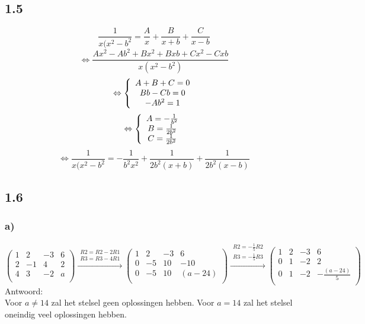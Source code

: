 \documentclass[11pt]{article}
\begin{document}
\subsection*{1.5}
\[
\frac{1}{x(x^2-b^2} = \frac{A}{x} + \frac{B}{x+b} + \frac{C}{x-b}
\]
\[
\Leftrightarrow
\frac{Ax^2-Ab^2+Bx^2+Bxb+Cx^2-Cxb}{x(x^2-b^2)}
\]
\[
\Leftrightarrow
\left\lbrace
\begin{array}{c c}
A+B+C=0\\
Bb-Cb=0\\
-Ab^2=1
\end{array}
\right.
\]
\[
\Leftrightarrow
\left\lbrace
\begin{array}{c c}
A = -\frac{1}{b^2}\\
B = \frac{1}{2b^2}\\
C = \frac{1}{2b^2}
\end{array}
\right.
\]
\[
\Leftrightarrow
\frac{1}{x(x^2-b^2} = -\frac{1}{b^2x^2} + \frac{1}{2b^2(x+b)} + \frac{1}{2b^2(x-b)}
\]

\subsection*{1.6}
\subsubsection*{a)}
\[
\begin{pmatrix}
  1 & 2 & -3 & 6 \\
  2 & -1 & 4 & 2 \\
  4 & 3 & -2 & a \\
 \end{pmatrix}
  \overset{\begin{matrix}
  R2 = R2 - 2R1 \\
  R3 = R3 - 4R1
 \end{matrix}}{\rightarrow}
\begin{pmatrix}
  1 & 2 & -3 & 6 \\
  0 & -5 & 10 & -10 \\
  0 & -5 & 10 & (a-24) \\
 \end{pmatrix}
 \overset{\begin{matrix}
  R2 = -\frac{1}{5}R2 \\
  R3 = -\frac{1}{5}R3
 \end{matrix}}{\rightarrow}
 \begin{pmatrix}
  1 & 2 & -3 & 6 \\
  0 & 1 & -2 & 2 \\
  0 & 1 & -2 & -\frac{(a-24)}{5} \\
 \end{pmatrix}
\]
Antwoord:\\
Voor $a\neq14$ zal het stelsel geen oplossingen hebben.
Voor $a=14$ zal het stelsel oneindig veel oplossingen hebben.
\end{document}
